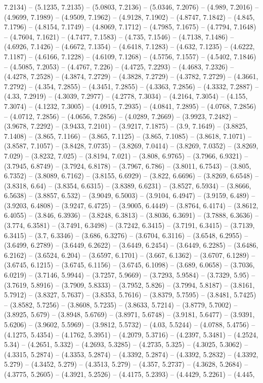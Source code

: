 7.2134) -- (5.1235, 7.2135) -- (5.0803, 7.2136) -- (5.0346, 7.2076) -- (4.989, 7.2016) -- (4.9699, 7.1989) -- (4.9509, 7.1962) -- (4.9128, 7.1902) -- (4.8747, 7.1842) -- (4.845, 7.1796) -- (4.8154, 7.1749) -- (4.8069, 7.1712) -- (4.7985, 7.1675) -- (4.7794, 7.1648) -- (4.7604, 7.1621) -- (4.7477, 7.1583) -- (4.735, 7.1546) -- (4.7138, 7.1486) -- (4.6926, 7.1426) -- (4.6672, 7.1354) -- (4.6418, 7.1283) -- (4.632, 7.1235) -- (4.6222, 7.1187) -- (4.6166, 7.1228) -- (4.6109, 7.1268) -- (4.5756, 7.1557) -- (4.5402, 7.1846) -- (4.5085, 7.2053) -- (4.4767, 7.226) -- (4.4725, 7.2293) -- (4.4683, 7.2326) -- (4.4278, 7.2528) -- (4.3874, 7.2729) -- (4.3828, 7.2729) -- (4.3782, 7.2729) -- (4.3661, 7.2792) -- (4.354, 7.2855) -- (4.3451, 7.2855) -- (4.3363, 7.2856) -- (4.3332, 7.2887) -- (4.33, 7.2919) -- (4.3039, 7.2977) -- (4.2778, 7.3034) -- (4.2164, 7.3054) -- (4.155, 7.3074) -- (4.1232, 7.3005) -- (4.0915, 7.2935) -- (4.0841, 7.2895) -- (4.0768, 7.2856) -- (4.0712, 7.2856) -- (4.0656, 7.2856) -- (4.0289, 7.2669) -- (3.9923, 7.2482) -- (3.9678, 7.2292) -- (3.9433, 7.2101) -- (3.9217, 7.1875) -- (3.9, 7.1649) -- (3.8825, 7.1408) -- (3.865, 7.1166) -- (3.865, 7.1125) -- (3.865, 7.1085) -- (3.8618, 7.1071) -- (3.8587, 7.1057) -- (3.8428, 7.0735) -- (3.8269, 7.0414) -- (3.8269, 7.0352) -- (3.8269, 7.029) -- (3.8232, 7.025) -- (3.8194, 7.021) -- (3.808, 6.9765) -- (3.7966, 6.9321) -- (3.7945, 6.8749) -- (3.7924, 6.8178) -- (3.7967, 6.786) -- (3.8011, 6.7543) -- (3.805, 6.7352) -- (3.8089, 6.7162) -- (3.8155, 6.6929) -- (3.822, 6.6696) -- (3.8269, 6.6548) -- (3.8318, 6.64) -- (3.8354, 6.6315) -- (3.8389, 6.6231) -- (3.8527, 6.5934) -- (3.8666, 6.5638) -- (3.8857, 6.532) -- (3.9049, 6.5003) -- (3.9104, 6.4947) -- (3.9159, 6.489) -- (3.9203, 6.4808) -- (3.9247, 6.4725) -- (3.9005, 6.4449) -- (3.8764, 6.4174) -- (3.8612, 6.4055) -- (3.846, 6.3936) -- (3.8248, 6.3813) -- (3.8036, 6.3691) -- (3.7888, 6.3636) -- (3.774, 6.3581) -- (3.7491, 6.3498) -- (3.7242, 6.3415) -- (3.7191, 6.3415) -- (3.7139, 6.3415) -- (3.7, 6.3346) -- (3.686, 6.3276) -- (3.6704, 6.3116) -- (3.6548, 6.2955) -- (3.6499, 6.2789) -- (3.6449, 6.2622) -- (3.6449, 6.2454) -- (3.6449, 6.2285) -- (3.6486, 6.2162) -- (3.6524, 6.204) -- (3.6597, 6.1701) -- (3.667, 6.1362) -- (3.6707, 6.1289) -- (3.6745, 6.1215) -- (3.6745, 6.1156) -- (3.6745, 6.1098) -- (3.689, 6.0658) -- (3.7036, 6.0219) -- (3.7146, 5.9944) -- (3.7257, 5.9669) -- (3.7293, 5.9584) -- (3.7329, 5.95) -- (3.7619, 5.8916) -- (3.7909, 5.8333) -- (3.7952, 5.826) -- (3.7994, 5.8187) -- (3.8161, 5.7912) -- (3.8327, 5.7637) -- (3.8353, 5.7616) -- (3.8379, 5.7595) -- (3.8481, 5.7425) -- (3.8582, 5.7256) -- (3.8608, 5.7235) -- (3.8633, 5.7214) -- (3.8779, 5.7002) -- (3.8925, 5.679) -- (3.8948, 5.6769) -- (3.8971, 5.6748) -- (3.9181, 5.6477) -- (3.9391, 5.6206) -- (3.9602, 5.5969) -- (3.9812, 5.5732) -- (4.03, 5.5244) -- (4.0788, 5.4756) -- (4.1275, 5.4354) -- (4.1762, 5.3951) -- (4.2079, 5.3716) -- (4.2397, 5.3481) -- (4.2524, 5.34) -- (4.2651, 5.332) -- (4.2693, 5.3285) -- (4.2735, 5.325) -- (4.3025, 5.3062) -- (4.3315, 5.2874) -- (4.3353, 5.2874) -- (4.3392, 5.2874) -- (4.3392, 5.2832) -- (4.3392, 5.279) -- (4.3452, 5.279) -- (4.3513, 5.279) -- (4.357, 5.2737) -- (4.3628, 5.2684) -- (4.3775, 5.2605) -- (4.3921, 5.2526) -- (4.4175, 5.2393) -- (4.4429, 5.2261) -- (4.445, 